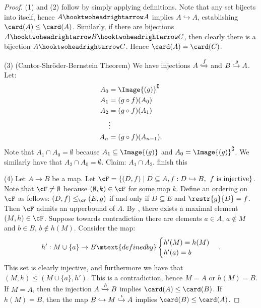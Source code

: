         \begin{proof}
            (1) and (2) follow by simply applying definitions. Note that any set bijects into itself, hence $A \hooktwoheadrightarrow A$ implies $A \hookrightarrow A$, establishing $\card(A) \leq \card(A)$. Similarly, if there are bijections $A\hooktwoheadrightarrow B \hooktwoheadrightarrow C$, then clearly there is a bijection $A \hooktwoheadrightarrow C$. Hence $\card(A) = \card(C)$.

            (3) (Cantor-Shr\"{o}der-Bernstein Theorem) We have injections $A \xhookrightarrow{f}$ and $B \xhookrightarrow{g} A$. Let:
                \begin{equation*}
                \begin{split}
                    A_0 &= \Image{(g)}^\complement \\
                    A_1 &= (g \circ f)(A_0) \\
                    A_2 & = (g \circ f)(A_1) \\
                    &\vdots \\
                    A_n & = (g \circ f)(A_{n-1}).
                \end{split}
                \end{equation*}
            Note that $A_1 \cap A_0 = \emptyset$ because $A_1 \subseteq \Image{(g)}$ and $A_0 = \Image{(g)}^\complement$. We similarly have that $A_2 \cap A_0 = \emptyset$. Claim: $A_1 \cap A_2$. {\color{red} finish this}
            
            (4) Let $A \rightarrow B$ be a map. Let $\cF = \{(D,f) \mid D \subseteq A, f:D \hookrightarrow B, \hspace{4pt}\text{$f$ is injective}\}$. Note that $\cF \neq \emptyset$ because $(\emptyset, k) \in \cF$ for some map $k$. Define an ordering on $\cF$ as follows: $(D,f) \leq_\cF (E,g)$ if and only if $D \subseteq E$ and $\restr{g}{D} = f$. Then $\cF$ admits an upperbound of $A$. By , there exists a maximal element $(M,h) \in \cF$. Suppose towards contradiction there are elements $a \in A$, $a \not\in M$ and $b \in B$, $b \not\in h(M)$. Consider the map:
                \begin{equation*}
                    h': M \cup \{a\} \rightarrow B \mtext{defined by} \begin{cases}
                        h'(M) = h(M) \\
                        h'(a) = b
                    \end{cases}.
                \end{equation*}
            This set is clearly injective, and furthermore we have that $(M,h) \leq (M \cup \{a\},h')$. This is a contradiction, hence $M = A$ or $h(M) = B$. If $M=A$, then the injection $A \xhookrightarrow{h} B$ implies $\card(A) \leq \card(B)$. If $h(M) = B$, then the map $B \hookrightarrow M \xhookrightarrow{\iota} A$ implies $\card(B) \leq \card(A)$. 
        \end{proof}

